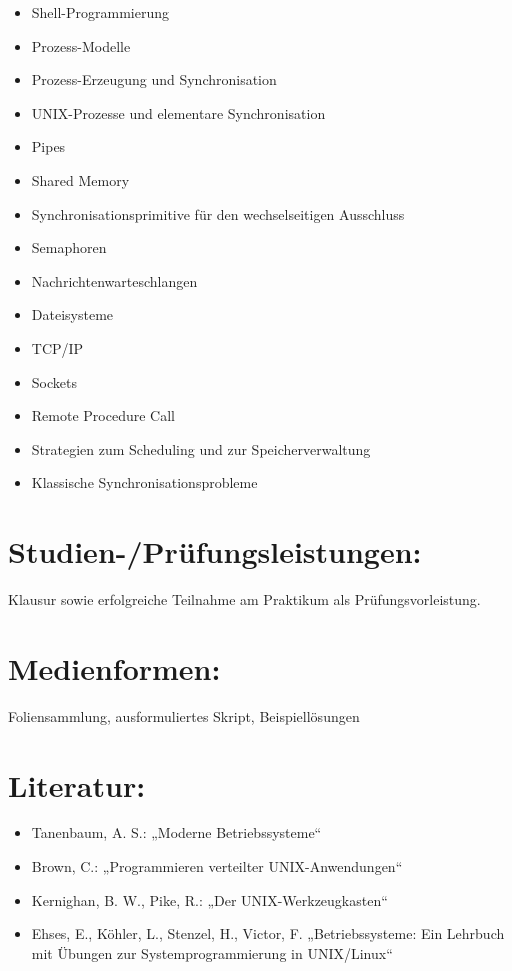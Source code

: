 \begin{itemize}
\item
  Shell-Programmierung
\item
  Prozess-Modelle
\item
  Prozess-Erzeugung und Synchronisation
\item
  UNIX-Prozesse und elementare Synchronisation
\item
  Pipes
\item
  Shared Memory
\item
  Synchronisationsprimitive für den wechselseitigen Ausschluss
\item
  Semaphoren
\item
  Nachrichtenwarteschlangen
\item
  Dateisysteme
\item
  TCP/IP
\item
  Sockets
\item
  Remote Procedure Call
\item
  Strategien zum Scheduling und zur Speicherverwaltung
\item
  Klassische Synchronisationsprobleme
\end{itemize}

\section*{Studien-/Prüfungsleistungen:}\label{studien-pruxfcfungsleistungen-4}

Klausur sowie erfolgreiche Teilnahme am Praktikum als
Prüfungsvorleistung.

\section*{Medienformen:}\label{medienformen-3}

Foliensammlung, ausformuliertes Skript, Beispiellösungen

\section*{Literatur:}\label{literatur-3}

\begin{itemize}
\item
  Tanenbaum, A. S.: „Moderne Betriebssysteme``
\item
  Brown, C.: „Programmieren verteilter UNIX-Anwendungen``
\item
  Kernighan, B. W., Pike, R.: „Der UNIX-Werkzeugkasten``
\item
  Ehses, E., Köhler, L., Stenzel, H., Victor, F. „Betriebssysteme: Ein
  Lehrbuch mit Übungen zur Systemprogrammierung in UNIX/Linux``
\end{itemize}

